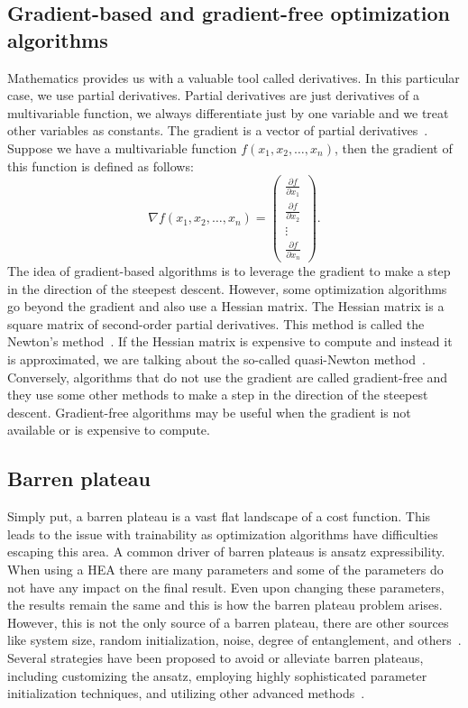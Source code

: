 \subsection{Gradient-based and gradient-free optimization algorithms}
Mathematics provides us with a valuable tool called derivatives. In this particular case, we use partial derivatives. Partial derivatives are just derivatives of a multivariable function, we always differentiate just by one variable and we treat other variables as constants. The gradient is a vector of partial derivatives~\cite{mmp}. Suppose we have a multivariable function $f(x_1, x_2, \ldots, x_n)$, then the gradient of this function is defined as follows:
\begin{equation*}
    \nabla f(x_1, x_2, \ldots, x_n) =  \begin{pmatrix} \frac{\partial f}{\partial x_1} \\ \frac{\partial f}{\partial x_2} \\ \vdots \\ \frac{\partial f}{\partial x_n}\end{pmatrix} \text{.}
\end{equation*}
The idea of gradient-based algorithms is to leverage the gradient to make a step in the direction of the steepest descent. However, some optimization algorithms go beyond the gradient and also use a Hessian matrix. The Hessian matrix is a square matrix of second-order partial derivatives. This method is called the Newton's method~\cite{newton}. If the Hessian matrix is expensive to compute and instead it is approximated, we are talking about the so-called quasi-Newton method~\cite{quasi-newton}. Conversely, algorithms that do not use the gradient are called gradient-free and they use some other methods to make a step in the direction of the steepest descent. Gradient-free algorithms may be useful when the gradient is not available or is expensive to compute.

\subsection{Barren plateau}
Simply put, a barren plateau is a vast flat landscape of a cost function. This leads to the issue with trainability as optimization algorithms have difficulties escaping this area. A common driver of barren plateaus is ansatz expressibility. When using a HEA there are many parameters and some of the parameters do not have any impact on the final result. Even upon changing these parameters, the results remain the same and this is how the barren plateau problem arises. However, this is not the only source of a barren plateau, there are other sources like system size, random initialization, noise, degree of entanglement, and others~\cite{vqe_method}.
Several strategies have been proposed to avoid or alleviate barren plateaus, including customizing the ansatz, employing highly sophisticated parameter initialization techniques, and utilizing other advanced methods~\cite{vqe_method}.